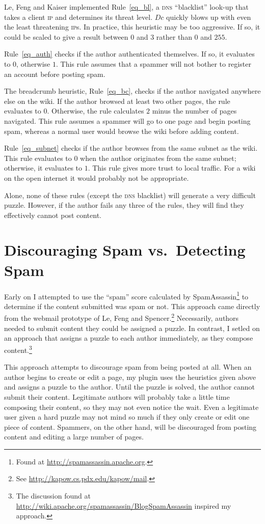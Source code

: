 \documentclass[12pt]{article}
\def\ip{\textsc{ip}\xspace}
\def\dns{\textsc{dns}\xspace}
\newcounter{rules}
\begin{document}
Le, Feng and Kaiser implemented Rule~\eqref{eq_bl}, a \dns
``blacklist'' look-up that takes a client \ip and determines its
threat level. $Dc$ quickly blows up with even the least threatening
{\ip}s. In practice, this heuristic may be too aggressive. If so, it
could be scaled to give a result between $0$ and $3$ rather than $0$
and $255$.

Rule~\eqref{eq_auth} checks if the author authenticated themselves. If
so, it evaluates to $0$, otherwise $1$. This rule assumes that a
spammer will not bother to register an account before posting spam.

The breadcrumb heuristic, Rule~\eqref{eq_bc}, checks if the author
navigated anywhere else on the wiki. If the author browsed at least
two other pages, the rule evaluates to $0$. Otherwise, the rule calculates $2$
minus the number of pages navigated. This rule assumes a spammer will
go to one page and begin posting spam, whereas a normal user would
browse the wiki before adding content.

Rule~\eqref{eq_subnet} checks if the author browses from the same
subnet as the wiki. This rule evaluates to $0$ when the author
originates from the same subnet; otherwise, it evaluates to $1$. This
rule gives more trust to local traffic. For a wiki on the open
internet it would probably not be appropriate.

Alone, none of these rules (except the \dns blacklist) will generate a
very difficult puzzle. However, if the author fails any three of the
rules, they will find they effectively cannot post content.

\section*{Discouraging Spam vs.\ Detecting Spam}
Early on I attempted to use the ``spam'' score calculated by
SpamAssassin\footnote{Found at \url{http://spamassassin.apache.org}.}
to determine if the content submitted was spam or not. This approach
came directly from the webmail prototype of Le, Feng and
Spencer.\footnote{See \url{http://kapow.cs.pdx.edu/kapow/mail}.}
Necessarily, authors needed to submit content they could be
assigned a puzzle. In contrast, I setled on an approach that
assigns a puzzle to each author immediately, as they compose content.\footnote{The discussion
found at \url{http://wiki.apache.org/spamassassin/BlogSpamAssassin} inspired
my approach.}

This approach attempts to discourage spam from being posted at
all. When an author begins to create or edit a page, my plugin uses
the heuristics given above and assigns a puzzle to the author. Until
the puzzle is solved, the author cannot submit their
content. Legitimate authors will probably take a little time composing
their content, so they may not even notice the wait. Even a legitimate
user given a hard puzzle may not mind so much if they only create or
edit one piece of content. Spammers, on the other hand, will be discouraged from
posting content and editing a large number of pages.
\end{document}
